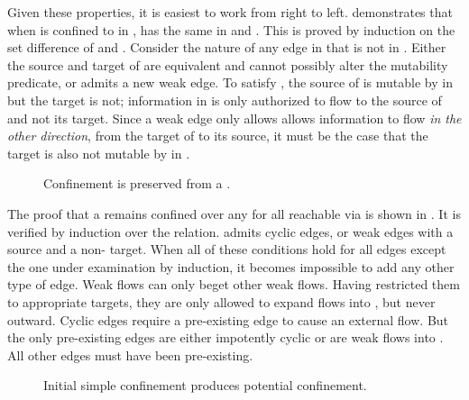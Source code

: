 Given these properties, it is easiest to work from right to left.
 demonstrates that when \TMsubsystem{}  is confined to  in ,  has the same \TMmutability{} in  and .
This is proved by induction on the set difference of  and .
Consider the nature of any edge  in  that is not in .
Either the source and target of  are equivalent and cannot possibly alter the mutability predicate, or  admits a new weak edge.
To satisfy \TMagConfined{}, the source of  is mutable by  in  but the target is not; information in  is only authorized to flow to the source of  and not its target.
Since a weak edge only allows allows information to flow \emph{in the other direction}, from the target of  to its source, it must be the case that the target is also not mutable by  in .

\begin{figure}
  \COQDOCsubsetEqAgConfinedPotTransferMax
  \caption{Confinement is preserved from a \TMmaximal{} \TMaccessGraph{}.\label{fig:confinement:subsetEqAgConfinedPotTransferMax}}
\end{figure}

The proof that a \TMsubsystem{} remains confined over any \TMmaximal{} \TMaccessGraph{} for all \TMaccessGraphs{} reachable via \TMpotTransfer{} is shown in .
It is verified by induction over the \TMpotTransfer{} relation.
\xmakefirstuc{\TMagConfined} admits cyclic edges, or weak edges with a \TMmutable{} source and a non-\TMmutable{} target.
When all of these conditions hold for all edges except the one under examination by induction, it becomes impossible to add any other type of edge.
Weak flows can only beget other weak flows.  Having restricted them to appropriate targets, they are only allowed to expand flows into , but never outward.
Cyclic edges require a pre-existing edge to cause an external flow.  But the only pre-existing edges are either impotently cyclic or are weak flows into .
All other edges must have been pre-existing.

\begin{figure}
  \COQDOCdirAccConfined{}
  \caption{Initial simple confinement produces potential confinement. \label{fig:confinement:dirAccConfined}}
\end{figure}

